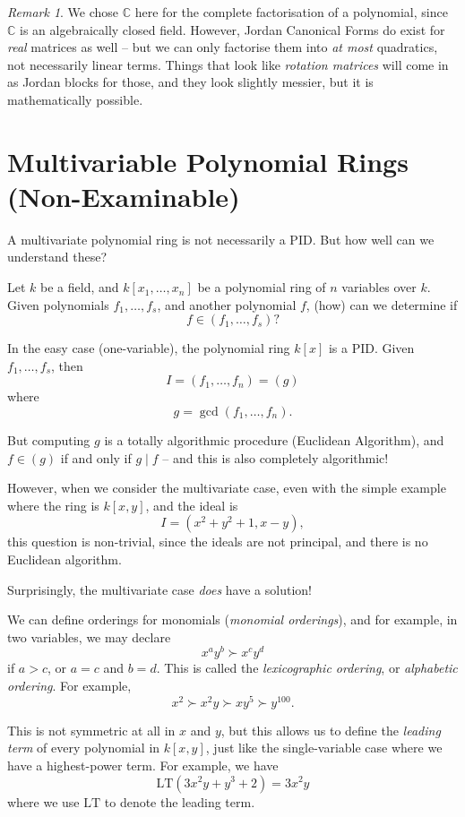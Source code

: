 \documentclass{article}
\theoremstyle{definition}
\theoremstyle{remark}
\newtheorem{remark}[theorem]{Remark}
\newcommand{\pqty}[1]{\left(#1\right)}
\newcommand{\bqty}[1]{\left[#1\right]}
\newcommand{\divides}{\mid}
\newcommand{\CC}{\mathbb{C}}
\begin{document}
\begin{remark}
    We chose \(\CC\) here for the complete factorisation of a polynomial, since \(\CC\) is an algebraically closed field. However, Jordan Canonical Forms do exist for \emph{real} matrices as well -- but we can only factorise them into \emph{at most} quadratics, not necessarily linear terms. Things that look like \emph{rotation matrices} will come in as Jordan blocks for those, and they look slightly messier, but it is mathematically possible.
\end{remark}
\appendix
\section{Multivariable Polynomial Rings (Non-Examinable)}

A multivariate polynomial ring is not necessarily a PID. But how well can we understand these?

Let \(k\) be a field, and \(k\bqty{x_1, \ldots, x_n}\) be a polynomial ring of \(n\) variables over \(k\). Given polynomials \(f_1, \ldots, f_s\), and another polynomial \(f\), (how) can we determine if
\[
    f \in \pqty{f_1, \ldots, f_s}?
\]

In the easy case (one-variable), the polynomial ring \(k\bqty{x}\) is a PID. Given \(f_1, \ldots, f_s\), then
\[
    I = \pqty{f_1, \ldots, f_n} = \pqty{g}
\]
where
\[
    g = \gcd\pqty{f_1, \ldots, f_n}.
\]

But computing \(g\) is a totally algorithmic procedure (Euclidean Algorithm), and \(f \in \pqty{g}\) if and only if \(g \divides f\) -- and this is also completely algorithmic!

However, when we consider the multivariate case, even with the simple example where the ring is \(k\bqty{x, y}\), and the ideal is
\[
    I = \pqty{x^2 + y^2 + 1, x - y},
\]
this question is non-trivial, since the ideals are not principal, and there is no Euclidean algorithm.

Surprisingly, the multivariate case \emph{does} have a solution!

We can define orderings for monomials (\emph{monomial orderings}), and for example, in two variables, we may declare
\[
    x^a y^b \succ x^c y^d
\]
if \(a > c\), or \(a = c\) and \(b = d\). This is called the \emph{lexicographic ordering}, or \emph{alphabetic ordering}. For example,
\[
    x^2 \succ x^2 y \succ x y^5 \succ y^{100}.
\]

This is not symmetric at all in \(x\) and \(y\), but this allows us to define the \emph{leading term} of every polynomial in \(k\bqty{x, y}\), just like the single-variable case where we have a highest-power term. For example, we have
\[
    \text{LT}\pqty{3x^2 y + y^3 + 2} = 3x^2 y
\]
where we use \(\text{LT}\) to denote the leading term.
\end{document}
